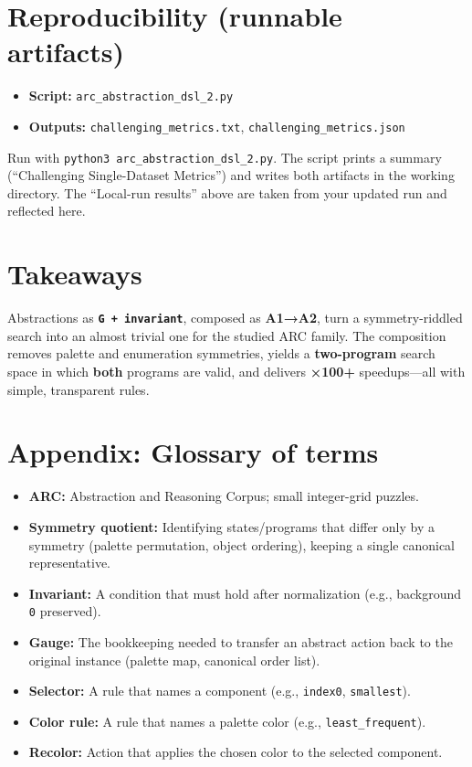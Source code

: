 \documentclass[11pt]{article}
\newcommand{\code}[1]{\texttt{#1}}
\begin{document}
\section{Reproducibility (runnable artifacts)}

\begin{itemize}
\item \textbf{Script:} \code{arc\_abstraction\_dsl\_2.py}
\item \textbf{Outputs:} \code{challenging\_metrics.txt}, \code{challenging\_metrics.json}
\end{itemize}

Run with \code{python3 arc\_abstraction\_dsl\_2.py}. The script prints a summary (``Challenging Single-Dataset Metrics'') and writes both artifacts in the working directory. The ``Local-run results'' above are taken from your updated run and reflected here.

\section{Takeaways}

Abstractions as \textbf{\code{G + invariant}}, composed as \textbf{A1→A2}, turn a symmetry-riddled search into an almost trivial one for the studied ARC family. The composition removes palette and enumeration symmetries, yields a \textbf{two-program} search space in which \textbf{both} programs are valid, and delivers \textbf{×100+} speedups---all with simple, transparent rules.

\section*{Appendix: Glossary of terms}

\begin{itemize}
\item \textbf{ARC:} Abstraction and Reasoning Corpus; small integer-grid puzzles.
\item \textbf{Symmetry quotient:} Identifying states/programs that differ only by a symmetry (palette permutation, object ordering), keeping a single canonical representative.
\item \textbf{Invariant:} A condition that must hold after normalization (e.g., background \code{0} preserved).
\item \textbf{Gauge:} The bookkeeping needed to transfer an abstract action back to the original instance (palette map, canonical order list).
\item \textbf{Selector:} A rule that names a component (e.g., \code{index0}, \code{smallest}).
\item \textbf{Color rule:} A rule that names a palette color (e.g., \code{least\_frequent}).
\item \textbf{Recolor:} Action that applies the chosen color to the selected component.
\end{itemize}
\end{document}
